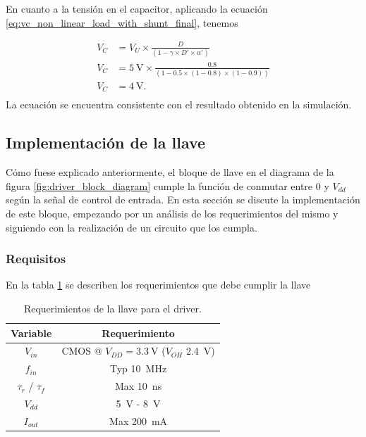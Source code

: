 En cuanto a la tensión en el capacitor, aplicando la ecuación
\ref{eq:vc_non_linear_load_with_shunt_final}, tenemos

\begin{equation}
    \begin{aligned}
        V_C &= V_U \times \frac{D}{\left( 1 - \gamma \times D' \times \alpha'\right)} \\
        V_C &= \qty{5}{\volt} \times \frac{0.8}{\left( 1 - 0.5 \times (1-0.8)
        \times (1-0.9) \right)} \\
        V_C &= \qty{4}{\volt}. \\
    \end{aligned}
\end{equation}
La ecuación se encuentra consistente con el resultado obtenido en la simulación.

\subsection{Implementación de la llave}

Cómo fuese explicado anteriormente, el bloque de llave en el diagrama de la
figura \ref{fig:driver_block_diagram} cumple la función de conmutar entre $0$ y
$V_{dd}$ según la señal de control de entrada. En esta sección se discute la
implementación de este bloque, empezando por un análisis de los requerimientos
del mismo y siguiendo con la realización de un circuito que los cumpla.

\subsubsection{Requisitos}

En la tabla
\ref{tab:llave_requirements} se describen los requerimientos que debe cumplir la
llave

\begin{table}
\centering
\begin{tabular}{c|c}
\hline
    Variable & Requerimiento \\
\hline
    $V_{in}$                &   CMOS @ $V_{DD}=\qty{3.3}{\volt}$ ($V_{OH}$
    \qty{2.4}{\volt})     \\
    $f_{in}$                &   Typ \qty{10}{\mega\hertz} \\
    $\tau_{r}$ / $\tau_{f}$ &   Max \qty{10}{\nano\second} \\
    $V_{dd}$                &   \qty{5}{\volt} - \qty{8}{\volt} \\
    $I_{out}$               &   Max \qty{200}{\milli\ampere} \\
\hline
\end{tabular}
\caption{Requerimientos de la llave para el driver.}
\label{tab:llave_requirements}
\end{table}

